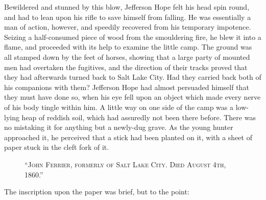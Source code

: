 \documentclass[12pt,english]{book}
\newcommand{\noun}[1]{\textsc{#1}}
\begin{document}
Bewildered and stunned by this blow, Jefferson Hope felt his head
spin round, and had to lean upon his rifle to save himself from falling.
He was essentially a man of action, however, and speedily recovered
from his temporary impotence. Seizing a half-consumed piece of wood
from the smouldering fire, he blew it into a flame, and proceeded
with its help to examine the little camp. The ground was all stamped
down by the feet of horses, showing that a large party of mounted
men had overtaken the fugitives, and the direction of their tracks
proved that they had afterwards turned back to Salt Lake City. Had
they carried back both of his companions with them? Jefferson Hope
had almost persuaded himself that they must have done so, when his
eye fell upon an object which made every nerve of his body tingle
within him. A little way on one side of the camp was a low-lying heap
of reddish soil, which had assuredly not been there before. There
was no mistaking it for anything but a newly-dug grave. As the young
hunter approached it, he perceived that a stick had been planted on
it, with a sheet of paper stuck in the cleft fork of it. %
\begin{figure}[htbp]
\noindent {}

\noindent \begin{center}\noun{{}``John Ferrier, formerly of Salt
Lake City. Died August 4th, 1860.''}\end{center}
\end{figure}
The inscription upon the paper was brief, but to the point:
\end{document}
